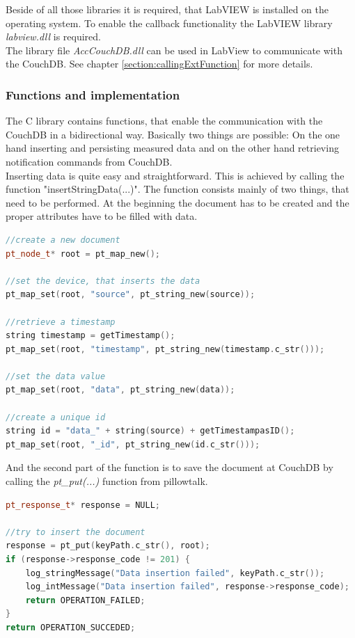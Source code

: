 Beside of all those libraries it is required, that LabVIEW is installed on the operating system. To enable the callback functionality the LabVIEW library \textit{labview.dll} is required. \\
The library file \textit{AccCouchDB.dll} can be used in LabView to communicate with the CouchDB. See chapter \ref{section:callingExtFunction} for more details.

\subsubsection{Functions and implementation}
The C library contains functions, that enable the communication with the CouchDB in a bidirectional way. Basically two things are possible: On the one hand inserting and persisting measured data and on the other hand retrieving notification commands from CouchDB.\\

Inserting data is quite easy and straightforward. This is achieved by calling the function "insertStringData(...)". The function consists mainly of two things, that need to be performed. At the beginning the document has to be created and the proper attributes have to be filled with data. 
\begin{lstlisting}[language=C++]
//create a new document
pt_node_t* root = pt_map_new();

//set the device, that inserts the data
pt_map_set(root, "source", pt_string_new(source));

//retrieve a timestamp
string timestamp = getTimestamp();
pt_map_set(root, "timestamp", pt_string_new(timestamp.c_str()));

//set the data value
pt_map_set(root, "data", pt_string_new(data));
	
//create a unique id 
string id = "data_" + string(source) + getTimestampasID();
pt_map_set(root, "_id", pt_string_new(id.c_str()));
\end{lstlisting}

And the second part of the function is to save the document at CouchDB by calling the \textit{pt\_put(...)} function from pillowtalk.
\begin{lstlisting}[language=C++]
pt_response_t* response = NULL;

//try to insert the document
response = pt_put(keyPath.c_str(), root);
if (response->response_code != 201) {
	log_stringMessage("Data insertion failed", keyPath.c_str());
	log_intMessage("Data insertion failed", response->response_code);
	return OPERATION_FAILED;
}
return OPERATION_SUCCEDED;
\end{lstlisting}

